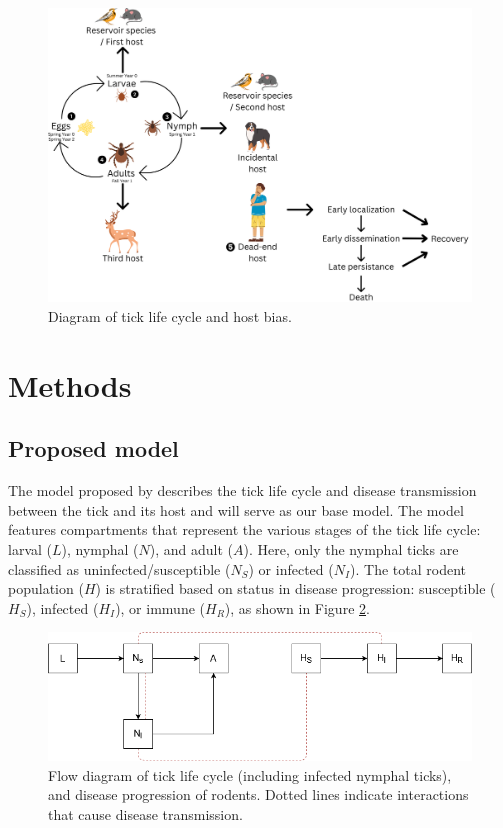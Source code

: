 \documentclass[12pt, centerh1]{article}
\begin{document}
\begin{figure}[h]
    \centering
    \includegraphics[scale = 0.15]{figures/Tick life cycle and progression of Lyme disease.png}
    \caption{Diagram of tick life cycle and host bias.}
    \label{fig:lifecycle}
\end{figure}

\section{Methods}

\subsection{Proposed model}
The model proposed by \citet{tosato2021host} describes the tick life cycle and disease transmission between the tick and its host and will serve as our base model. The model features compartments that represent the various stages of the tick life cycle: larval ($L$), nymphal ($N$), and adult ($A$). Here, only the nymphal ticks are classified as uninfected/susceptible ($N_S$) or infected ($N_I$). The total rodent population ($H$) is stratified based on status in disease progression: susceptible ($H_S$), infected ($H_I$), or immune ($H_R$), as shown in Figure \ref{fig:flowchart}.

\begin{figure}[h]
    \centering
    \includegraphics[width=\textwidth]{figures/acaricide_diagram.png}
    \caption{Flow diagram of tick life cycle (including infected nymphal ticks), and disease progression of rodents. Dotted lines indicate interactions that cause disease transmission.}
    \label{fig:flowchart}
\end{figure}
\end{document}
